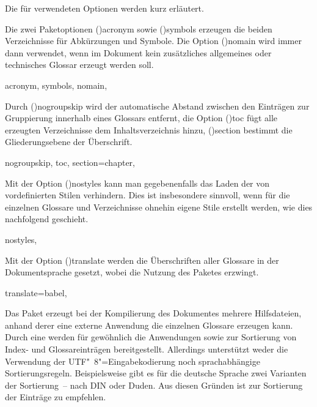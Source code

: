 \documentclass[%
  english,ngerman,%
  cdgeometry=no,DIV=12,%
  cd=false,cdfont=false,cdtitle=true,%
  headings=normal,%
  automark,%
  listof=toc,%
]{tudscrartcl}
\begin{document}
Die für  verwendeten Optionen werden kurz erläutert.
%
\begin{Preamble+}
\AtEndPreamble{%
\end{Preamble+}
\begin{Preamble}
\usepackage[%
\end{Preamble}
%
Die zwei Paketoptionen \Option(){acronym} sowie 
\Option(){symbols} erzeugen die beiden Verzeichnisse für 
Abkürzungen und Symbole. Die Option \Option(){nomain} wird 
immer dann verwendet, wenn im Dokument kein zusätzliches allgemeines oder 
technisches Glossar erzeugt werden soll.
%
\begin{Preamble}
  acronym,%
  symbols,%
  nomain,%
\end{Preamble}
%
Durch \Option(){nogroupskip} wird der automatische Abstand 
zwischen den Einträgen zur Gruppierung innerhalb eines Glossars entfernt, die 
Option \Option(){toc} fügt alle erzeugten Verzeichnisse 
dem Inhaltsverzeichnis hinzu, \Option(){section} bestimmt 
die Gliederungsebene der Überschrift.
%
\begin{Preamble}
  nogroupskip,%
  toc,%
  section=chapter,%
\end{Preamble}
%
Mit der Option \Option(){nostyles} kann man gegebenenfalls 
das Laden der von  vordefinierten Stilen verhindern. Dies 
ist insbesondere sinnvoll, wenn für die einzelnen Glossare und Verzeichnisse 
ohnehin eigene Stile erstellt werden, wie dies nachfolgend geschieht.
%
\begin{Preamble}
  nostyles,%
\end{Preamble}
%
Mit der Option \Option(){translate} werden die Überschriften
aller Glossare in der Dokumentsprache gesetzt, wobei  
die Nutzung des Paketes  erzwingt. 
%
\begin{Preamble}
  translate=babel,%
\end{Preamble}
%
Das Paket  erzeugt bei der Kompilierung des Dokumentes 
mehrere Hilfsdateien, anhand derer eine externe Anwendung die einzelnen 
Glossare erzeugen kann. Durch eine \Distro* werden für gewöhnlich die 
Anwendungen  sowie  zur Sortierung 
von Index- und Glossareinträgen bereitgestellt. Allerdings unterstützt 
 weder die Verwendung der UTF"~8"=Eingabekodierung noch 
sprachabhängige Sortierungsregeln. Beispielsweise gibt es für die deutsche 
Sprache zwei Varianten der Sortierung~-- nach DIN oder Duden. Aus diesen 
Gründen ist zur Sortierung der Einträge  zu empfehlen.
\end{document}
